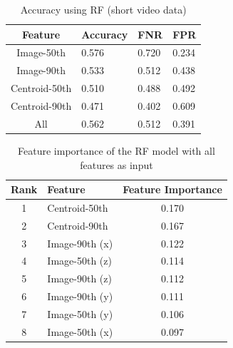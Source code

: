 \begin{table}[!b]
  \centering
  \caption{Accuracy using RF (short video data)}
    \begin{tabular}{clll} \hline
      Feature         & Accuracy & FNR   & FPR   \\ \hline \hline
      Image-50th      & 0.576    & 0.720 & 0.234 \\
      Image-90th      & 0.533    & 0.512 & 0.438 \\
      Centroid-50th   & 0.510    & 0.488 & 0.492 \\
      Centroid-90th   & 0.471    & 0.402 & 0.609 \\
      All             & 0.562    & 0.512 & 0.391 \\ \hline
    \end{tabular}
  \label{result_rf_train}
\end{table}

\begin{table}[!b]
	\centering
	\caption{Feature importance of the RF model with all features as input}
	\begin{tabular}{clc}
		\hline
		Rank & Feature      & Feature Importance \\ \hline \hline
		1    & Centroid-50th  & 0.170            \\
		2    & Centroid-90th  & 0.167            \\
		3    & Image-90th (x) & 0.122            \\
		4    & Image-50th (z) & 0.114            \\
		5    & Image-90th (z) & 0.112            \\
		6    & Image-90th (y) & 0.111            \\
		7    & Image-50th (y) & 0.106            \\
		8    & Image-50th (x) & 0.097            \\ \hline
	\end{tabular}
	\label{feature_importance_rf}
\end{table}

